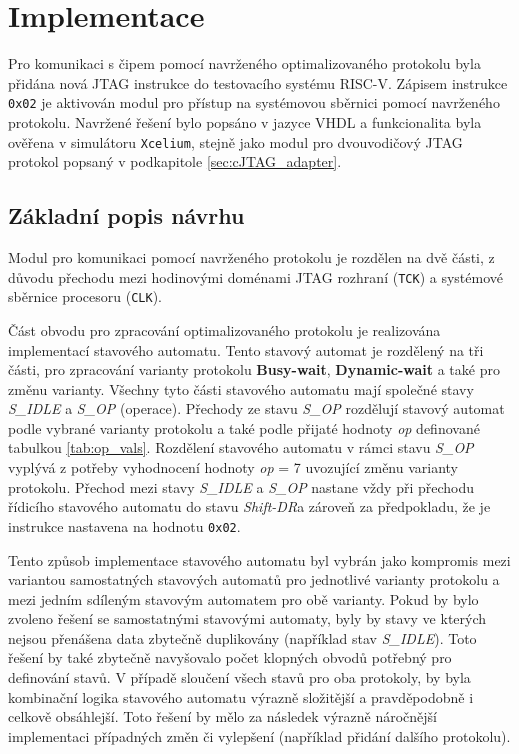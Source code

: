 \section{Implementace}
Pro komunikaci s čipem pomocí navrženého optimalizovaného protokolu byla přidána nová \acs{JTAG} instrukce do testovacího systému \acs{RISC-V}. Zápisem instrukce \texttt{0x02} je aktivován modul pro přístup na systémovou sběrnici pomocí navrženého protokolu. Navržené řešení bylo popsáno v jazyce \acs{VHDL} a funkcionalita byla ověřena v simulátoru \texttt{Xcelium}, stejně jako modul pro dvouvodičový \acs{JTAG} protokol popsaný v podkapitole \ref{sec:cJTAG_adapter}.

\subsection{Základní popis návrhu}	\label{subsec:jtag_ap_impl}
Modul pro komunikaci pomocí navrženého protokolu je rozdělen na dvě části, z důvodu přechodu mezi hodinovými doménami \acs{JTAG} rozhraní (\texttt{\acs{TCK}}) a systémové sběrnice procesoru (\texttt{CLK}).

Část obvodu pro zpracování optimalizovaného protokolu je realizována implementací stavového automatu. Tento stavový automat je rozdělený na tři části, pro zpracování varianty protokolu \textbf{Busy-wait}, \textbf{Dynamic-wait} a také pro změnu varianty. Všechny tyto části stavového automatu mají společné stavy \textit{S\_IDLE} a \textit{S\_OP} (operace). Přechody ze stavu \textit{S\_OP} rozdělují stavový automat podle vybrané varianty protokolu a také podle přijaté hodnoty \textit{op} definované tabulkou \ref{tab:op_vals}. Rozdělení stavového automatu v rámci stavu \textit{S\_OP} vyplývá z potřeby vyhodnocení hodnoty \textit{op} = 7 uvozující změnu varianty protokolu. Přechod mezi stavy \textit{S\_IDLE} a \textit{S\_OP} nastane vždy při přechodu řídicího stavového automatu do stavu \textit{Shift-DR}a zároveň za předpokladu, že je instrukce nastavena na hodnotu \texttt{0x02}.

Tento způsob implementace stavového automatu byl vybrán jako kompromis mezi variantou samostatných stavových automatů pro jednotlivé varianty protokolu a mezi jedním sdíleným stavovým automatem pro obě varianty. Pokud by bylo zvoleno řešení se samostatnými stavovými automaty, byly by stavy ve kterých nejsou přenášena data zbytečně duplikovány (například stav \textit{S\_IDLE}). Toto řešení by také zbytečně navyšovalo počet klopných obvodů potřebný pro definování stavů. V případě sloučení všech stavů pro oba protokoly, by byla kombinační logika stavového automatu výrazně složitější a pravděpodobně i celkově obsáhlejší. Toto řešení by mělo za následek výrazně náročnější implementaci případných změn či vylepšení (například přidání dalšího protokolu). 

